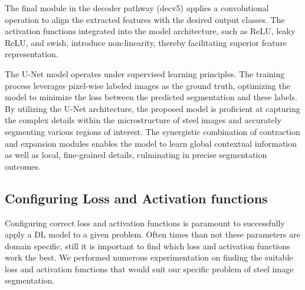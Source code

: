 \documentclass[]{article}
\begin{document}
The final module in the decoder pathway (decv5) applies a convolutional operation to align the extracted features with the desired output classes. The activation functions integrated into the model architecture, such as ReLU, leaky ReLU, and swish, introduce non-linearity, thereby facilitating superior feature representation. 

The U-Net model operates under supervised learning principles. The training process leverages pixel-wise labeled images as the ground truth, optimizing the model to minimize the loss between the predicted segmentation and these labels. By utilizing the U-Net architecture, the proposed model is proficient at capturing the complex details within the microstructure of steel images and accurately segmenting various regions of interest. The synergistic combination of contraction and expansion modules enables the model to learn global contextual information as well as local, fine-grained details, culminating in precise segmentation outcomes.

\subsection{Configuring Loss and Activation functions}

Configuring correct loss and activation functions is paramount to successfully apply a DL model to a given problem. Often times than not these parameters are domain specific, still it is important to find which loss and activation functions work the best. We performed numerous experimentation on finding the suitable loss and activation functions that would suit our specific problem of steel image segmentation.
\end{document}
